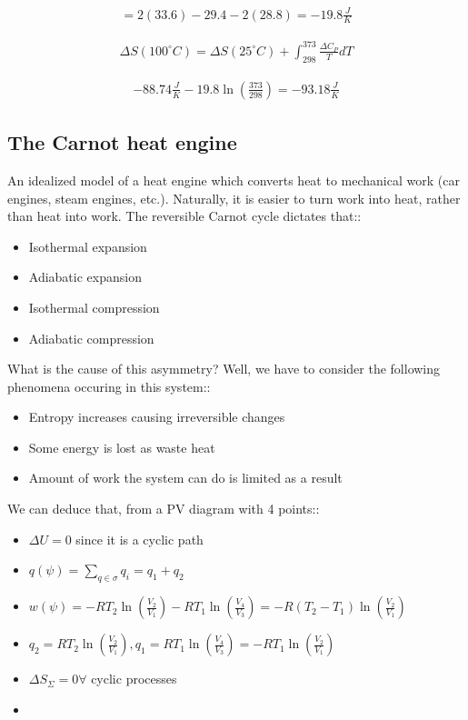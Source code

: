 \documentclass[12pt]{book}
\begin{document}
\begin{align*}
    =2(33.6)-29.4-2(28.8)=-19.8\frac{J}{K}
\end{align*}

\begin{align*}
    \Delta S(100^{\circ}C)=\Delta S(25^{\circ}C)+\int_{298}^{373}\frac{\Delta C_P}{T} dT
\end{align*}

\begin{align*}
    -88.74\frac{J}{K}-19.8\ln\left(\frac{373}{298}\right)=-93.18\frac{J}{K}
\end{align*}

\subsection*{The Carnot heat engine}

An idealized model of a heat engine which converts heat to mechanical work (car engines, steam engines, etc.). Naturally, it is easier to turn work into heat, rather than heat into work. The reversible Carnot cycle dictates that::

\begin{itemize}
    \item Isothermal expansion
    \item Adiabatic expansion
    \item Isothermal compression
    \item Adiabatic compression
\end{itemize}

What is the cause of this asymmetry? Well, we have to consider the following phenomena occuring in this system::

\begin{itemize}
    \item Entropy increases causing irreversible changes
    \item Some energy is lost as waste heat
    \item Amount of work the system can do is limited as a result
\end{itemize}

We can deduce that, from a PV diagram with 4 points::

\begin{itemize}
    \item $\Delta U=0$ since it is a cyclic path
    \item $q(\psi)=\sum_{q\in \sigma}q_i=q_1+q_2$
    \item $w(\psi)=-RT_2\ln\left(\frac{V_2}{V_1}\right)-RT_1\ln\left(\frac{V_4}{V_3}\right)=-R(T_2-T_1)\ln\left(\frac{V_2}{V_1}\right)$
    \item $q_2=RT_2\ln\left(\frac{V_2}{V_1}\right), q_1=RT_1\ln\left(\frac{V_4}{V_3}\right)=-RT_1\ln\left(\frac{V_2}{V_1}\right)$
    \item $\Delta S_\Sigma=0 \forall$ cyclic processes
    \item 
\end{itemize}
\end{document}
